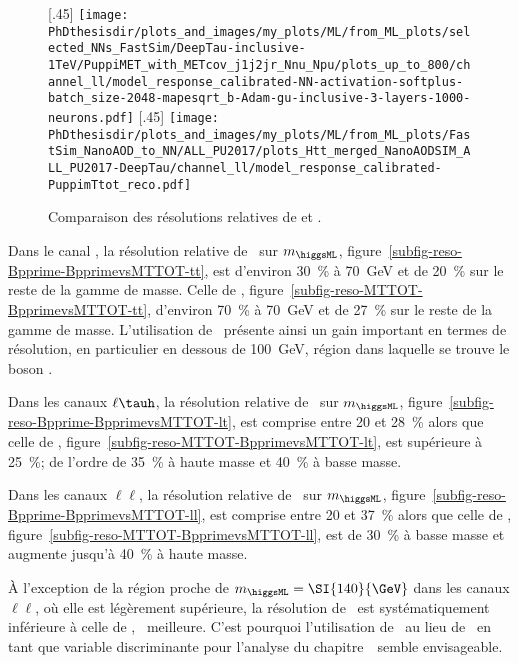 \begin{figure}[p]
[.45\textwidth]
{\texttt{[image: \\PhDthesisdir/plots\_and\_images/my\_plots/ML/from\_ML\_plots/selected\_NNs\_FastSim/DeepTau-inclusive-1TeV/PuppiMET\_with\_METcov\_j1j2jr\_Nnu\_Npu/plots\_up\_to\_800/channel\_ll/model\_response\_calibrated-NN-activation-softplus-batch\_size-2048-mapesqrt\_b-Adam-gu-inclusive-3-layers-1000-neurons.pdf]}\vspace{-.5\baselineskip}}
\hfill
{}[.45\textwidth]
{\texttt{[image: \\PhDthesisdir/plots\_and\_images/my\_plots/ML/from\_ML\_plots/FastSim\_NanoAOD\_to\_NN/ALL\_PU2017/plots\_Htt\_merged\_NanoAODSIM\_ALL\_PU2017-DeepTau/channel\_ll/model\_response\_calibrated-PuppimTtot\_reco.pdf]}\vspace{-.5\baselineskip}}

\caption{Comparaison des résolutions relatives de \mml et \mTtot.}
\label{fig-BpprimevsMTTOT-reso}
\end{figure}
\par
Dans le canal \tauh\tauh,
la résolution relative de \mml\ sur $m_{\higgsML}$,
figure~\ref{subfig-reso-Bpprime-BpprimevsMTTOT-tt},
est
d'environ \SI{30}{\%} à \SI{70}{\GeV}
et de \SI{20}{\%} sur le reste de la gamme de masse.
Celle de \mTtot,
figure~\ref{subfig-reso-MTTOT-BpprimevsMTTOT-tt},
d'environ \SI{70}{\%} à \SI{70}{\GeV}
et de \SI{27}{\%} sur le reste de la gamme de masse.
L'utilisation de \mml\ présente ainsi un gain important en termes de résolution,
en particulier en dessous de \SI{100}{\GeV}, région dans laquelle se trouve le boson \Zboson.
\par
Dans les canaux $\ell\tauh$,
la résolution relative de \mml\ sur $m_{\higgsML}$,
figure~\ref{subfig-reso-Bpprime-BpprimevsMTTOT-lt},
est
comprise entre \num{20} et \SI{28}{\%}
alors que
celle de \mTtot,
figure~\ref{subfig-reso-MTTOT-BpprimevsMTTOT-lt},
est supérieure à \SI{25}{\%};
de l'ordre de \SI{35}{\%} à haute masse et
\SI{40}{\%} à basse masse.
\par
Dans les canaux $\ell\ell$,
la résolution relative de \mml\ sur $m_{\higgsML}$,
figure~\ref{subfig-reso-Bpprime-BpprimevsMTTOT-ll},
est
comprise entre \num{20} et \SI{37}{\%}
alors que
celle de \mTtot,
figure~\ref{subfig-reso-MTTOT-BpprimevsMTTOT-ll},
est de \SI{30}{\%} à basse masse et augmente
jusqu'à \SI{40}{\%} à haute masse.
\par
À l'exception de la région proche de $m_{\higgsML}=\SI{140}{\GeV}$ dans les canaux $\ell\ell$,
où elle est légèrement supérieure,
la résolution de \mml\ est systématiquement inférieure à celle de \mTtot, \ie\ meilleure.
C'est pourquoi l'utilisation de \mml\ au lieu de \mTtot\ en tant que variable discriminante pour l'analyse du chapitre~\ semble envisageable.

